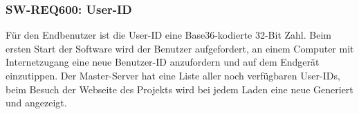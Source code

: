 \subsubsection{SW-REQ600: User-ID}
\label{sec:swreq600}
Für den Endbenutzer ist die User-ID eine Base36-kodierte 32-Bit Zahl. Beim ersten Start
der Software wird der Benutzer aufgefordert, an einem Computer mit
Internetzugang eine neue Benutzer-ID anzufordern und auf dem Endgerät
einzutippen. Der Master-Server hat eine Liste aller noch verfügbaren User-IDs,
beim Besuch der Webseite des Projekts wird bei jedem Laden eine neue Generiert
und angezeigt. 

 





